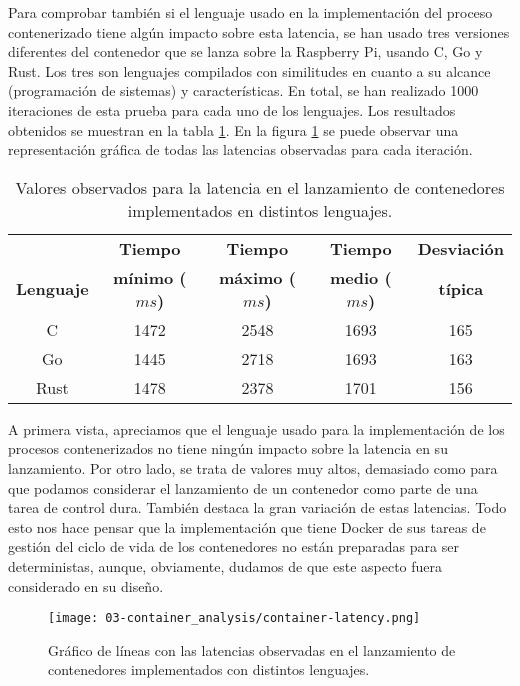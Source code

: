 Para comprobar también si el lenguaje usado en la implementación del proceso
contenerizado tiene algún impacto sobre esta latencia, se han usado tres
versiones diferentes del contenedor que se lanza sobre la Raspberry Pi, usando
C, Go y Rust. Los tres son lenguajes compilados con similitudes en cuanto a su
alcance (programación de sistemas) y características. En total, se han realizado
1000 iteraciones de esta prueba para cada uno de los lenguajes. Los resultados
obtenidos se muestran en la tabla \ref{tab:03-container_latency}. En la figura
\ref{fig:03-container_latency} se puede observar una representación gráfica de
todas las latencias observadas para cada iteración.

\begin{table}[H]
    \centering
    \begin{tabular}{ |c|c|c|c|c| }
        \hline
                          & \textbf{Tiempo}        & \textbf{Tiempo}        & \textbf{Tiempo}       & \textbf{Desviación} \\
        \textbf{Lenguaje} & \textbf{mínimo ($ms$)} & \textbf{máximo ($ms$)} & \textbf{medio ($ms$)} & \textbf{típica}     \\
        \hline
        C                 & 1472                   & 2548                   & 1693                  & 165                 \\
        \hline
        Go                & 1445                   & 2718                   & 1693                  & 163                 \\
        \hline
        Rust              & 1478                   & 2378                   & 1701                  & 156                 \\
        \hline
    \end{tabular}
    \caption{Valores observados para la latencia en el lanzamiento de
        contenedores implementados en distintos lenguajes.}
    \label{tab:03-container_latency}
\end{table}

A primera vista, apreciamos que el lenguaje usado para la implementación de los
procesos contenerizados no tiene ningún impacto sobre la latencia en su
lanzamiento. Por otro lado, se trata de valores muy altos, demasiado como para
que podamos considerar el lanzamiento de un contenedor como parte de una tarea
de control dura. También destaca la gran variación de estas latencias. Todo esto
nos hace pensar que la implementación que tiene Docker de sus tareas de gestión
del ciclo de vida de los contenedores no están preparadas para ser
deterministas, aunque, obviamente, dudamos de que este aspecto fuera considerado
en su diseño.

\begin{figure}
    \centering
    \texttt{[image: 03-container\_analysis/container-latency.png]}
    \caption{Gráfico de líneas con las latencias observadas en el lanzamiento de
        contenedores implementados con distintos lenguajes.}
    \label{fig:03-container_latency}
\end{figure}